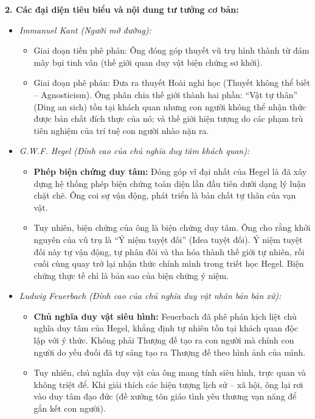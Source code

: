 \documentclass[12pt,a4paper]{article}
\begin{document}
\noindent
\textbf{2. Các đại diện tiêu biểu và nội dung tư tưởng cơ bản:}
\begin{itemize}
    \item \textit{Immanuel Kant (Người mở đường):}
    \begin{itemize}
        \item Giai đoạn tiền phê phán: Ông đóng góp thuyết vũ trụ hình thành từ đám mây bụi tinh vân (thế giới quan duy vật biện chứng sơ khởi).
        \item Giai đoạn phê phán: Đưa ra thuyết Hoài nghi học (Thuyết không thể biết -- Agnosticism). Ông phân chia thế giới thành hai phần: ``Vật tự thân'' (Ding an sich) tồn tại khách quan nhưng con người không thể nhận thức được bản chất đích thực của nó; và thế giới hiện tượng do các phạm trù tiên nghiệm của trí tuệ con người nhào nặn ra.
    \end{itemize}
    \item \textit{G.W.F. Hegel (Đỉnh cao của chủ nghĩa duy tâm khách quan):}
    \begin{itemize}
        \item \textbf{Phép biện chứng duy tâm:} Đóng góp vĩ đại nhất của Hegel là đã xây dựng hệ thống phép biện chứng toàn diện lần đầu tiên dưới dạng lý luận chặt chẽ. Ông coi sự vận động, phát triển là bản chất tự thân của vạn vật.
        \item Tuy nhiên, biện chứng của ông là biện chứng duy tâm. Ông cho rằng khởi nguyên của vũ trụ là ``Ý niệm tuyệt đối'' (Idea tuyệt đối). Ý niệm tuyệt đối này tự vận động, tự phân đôi và tha hóa thành thế giới tự nhiên, rồi cuối cùng quay trở lại nhận thức chính mình trong triết học Hegel. Biện chứng thực tế chỉ là bản sao của biện chứng ý niệm.
    \end{itemize}
    \item \textit{Ludwig Feuerbach (Đỉnh cao của chủ nghĩa duy vật nhân bản bản xứ):}
    \begin{itemize}
        \item \textbf{Chủ nghĩa duy vật siêu hình:} Feuerbach đã phê phán kịch liệt chủ nghĩa duy tâm của Hegel, khẳng định tự nhiên tồn tại khách quan độc lập với ý thức. Không phải Thượng đế tạo ra con người mà chính con người do yếu đuối đã tự sáng tạo ra Thượng đế theo hình ảnh của mình.
        \item Tuy nhiên, chủ nghĩa duy vật của ông mang tính siêu hình, trực quan và không triệt để. Khi giải thích các hiện tượng lịch sử -- xã hội, ông lại rơi vào duy tâm đạo đức (đề xướng tôn giáo tình yêu thương vạn năng để gắn kết con người).
    \end{itemize}
\end{itemize}
\end{document}
